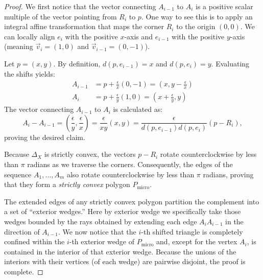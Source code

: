 \documentclass[11pt, reqno]{amsart}
\theoremstyle{definition}
\begin{document}
\begin{proof}
We first notice that the vector connecting $A_{i-1}$ to $A_i$ is a positive scalar multiple of the vector pointing from $R_i$ to $p$. One way to see this is to apply an integral affine transformation that maps the corner $R_i$ to the origin $(0,0)$. We can locally align $e_i$ with the positive $x$-axis and $e_{i-1}$ with the positive $y$-axis (meaning $\vec{v}_i = (1,0)$ and $\vec{v}_{i-1} = (0,-1)$).

Let $p = (x,y)$. By definition, $d(p, e_{i-1}) = x$ and $d(p, e_i) = y$. Evaluating the shifts yields:
\begin{align*}
    A_{i-1} &= p + \frac{\epsilon}{x} (0,-1) = \left(x, y - \frac{\epsilon}{x}\right) \\
    A_i &= p + \frac{\epsilon}{y} (1,0) = \left(x + \frac{\epsilon}{y}, y\right)
\end{align*}
The vector connecting $A_{i-1}$ to $A_i$ is calculated as:
\begin{equation}
    A_i - A_{i-1} = \left(\frac{\epsilon}{y}, \frac{\epsilon}{x}\right) = \frac{\epsilon}{xy} (x,y) = \frac{\epsilon}{d(p, e_{i-1}) d(p, e_i)} (p - R_i),
\end{equation} proving the desired claim.

Because $\Delta_X$ is strictly convex, the vectors $p - R_i$ rotate counterclockwise by less than $\pi$ radians as we traverse the corners. Consequently, the edges of the sequence $A_1, \dots, A_m$ also rotate counterclockwise by less than $\pi$ radians, proving that they form a \emph{strictly convex} polygon $P_{\text{micro}}$.

The extended edges of any strictly convex polygon partition the complement into a set of ``exterior wedges.'' Here by exterior wedge we specifically take those wedges bounded by the rays obtained by extending each edge $A_iA_{i-1}$ in the direction of $A_{i-1}$. We now notice that the  $i$-th shifted triangle is completely confined within the $i$-th exterior wedge of $P_{\text{micro}}$ and, except for the vertex $A_i$, is contained in the interior of that exterior wedge. Because the unions of the interiors with their vertices (of each wedge) are pairwise disjoint, the proof is complete.
\end{proof}
\end{document}
